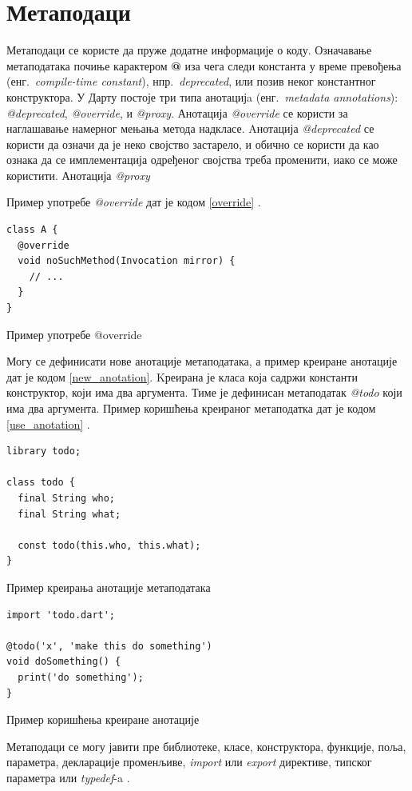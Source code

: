 \documentclass[12pt,oneside]{memoir}
\begin{document}
\section{Метаподаци}
\label{metapodaci}
Метаподаци се користе да пруже додатне информације о коду. Означавање метаподатака почиње карактером \textbf{@} иза чега следи константа у време превођења (енг.~\textit{compile-time constant}), нпр.~\textit{deprecated}, или позив неког константног конструктора. 
У Дарту постоје три типа анотацијa (енг.~\textit{metadata annotations}): \textit{@deprecated}, \textit{@override}, и \textit{@proxy}.
Анотација \textit{@override} се користи за наглашавање намерног мењања метода надкласе. Aнотација \textit{@deprecated} се користи да означи да је неко својство застарело, и обично се користи да као ознака да се имплементација одређеног својства треба променити, иако се може користити. Анотација  \textit{@proxy}

Пример употребе \textit{@override} дат је кодом \ref{override} \cite{dart, dart1}. 

\begin{listing}
\begin{verbatim}
class A {
  @override
  void noSuchMethod(Invocation mirror) {
    // ...
  }
}
\end{verbatim}
\caption{Пример употребе @override}
\label{override}
\end{listing}

Могу се дефинисати нове анотације метаподатака, а пример креиране анотације дат је кодом \ref{new_anotation}. Kреирана је класа која садржи константи конструктор, који има два аргумента. Тиме је дефинисан метаподатак \textit{@todo} који има два аргумента. Пример коришћења креираног метаподатка дат је кодом \ref{use_anotation} \cite{dart, dart1}.

\begin{listing}
\begin{verbatim}
library todo;

class todo {
  final String who;
  final String what;

  const todo(this.who, this.what);
}
\end{verbatim}
\caption{Пример креирања анотације метаподатака}
\label{new_anotation}
\end{listing}

\begin{listing}
\begin{verbatim}
import 'todo.dart';

@todo('x', 'make this do something')
void doSomething() {
  print('do something');
}
\end{verbatim}
\caption{Пример коришћења креиране анотације}
\label{use_anotation}
\end{listing}
Метаподаци се могу јавити пре библиотеке, класе, конструктора, функције, поља, параметра, декларације променљиве, \textit{import} или \textit{export} директиве, типског параметра или \textit{typedef}-a \cite{dart, dart1}.
\end{document}
